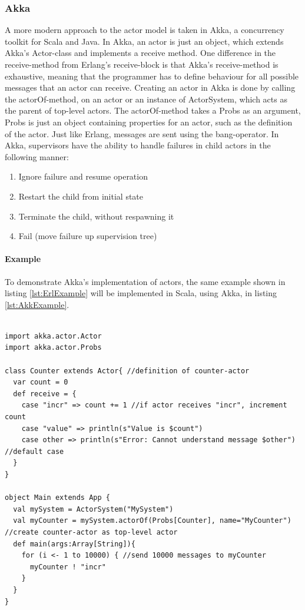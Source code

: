 \subsubsection{Akka}
A more modern approach to the actor model is taken in Akka, a concurrency toolkit for Scala and Java.
In Akka, an actor is just an object, which extends Akka's Actor-class and implements a receive method. One difference in the receive-method from Erlang's receive-block is that Akka's receive-method is exhaustive, meaning that the programmer has to define behaviour for all possible messages that an actor can receive. 
Creating an actor in Akka is done by calling the actorOf-method, on an actor or an instance of ActorSystem, which acts as the parent of top-level actors. The actorOf-method takes a Probs as an argument, Probs is just an object containing properties for an actor, such as the definition of the actor. Just like Erlang, messages are sent using the bang-operator.
In Akka, supervisors have the ability to handle failures in child actors in the following manner:
\begin{enumerate}
  \item Ignore failure and resume operation
  \item Restart the child from initial state
  \item Terminate the child, without respawning it
  \item Fail (move failure up supervision tree)
\end{enumerate}

\paragraph{Example}
To demonstrate Akka's implementation of actors, the same example shown in listing \ref{lst:ErlExample} will be implemented in Scala, using Akka, in listing \ref{lst:AkkExample}.

\begin{lstlisting}[style = scala, caption={A simple message-counter in Scala.}, label=lst:AkkExample]

import akka.actor.Actor
import akka.actor.Probs

class Counter extends Actor{ //definition of counter-actor
  var count = 0
  def receive = {
    case "incr" => count += 1 //if actor receives "incr", increment count
    case "value" => println(s"Value is $count")
    case other => println(s"Error: Cannot understand message $other") //default case
  }
}

object Main extends App {
  val mySystem = ActorSystem("MySystem")
  val myCounter = mySystem.actorOf(Probs[Counter], name="MyCounter") //create counter-actor as top-level actor
  def main(args:Array[String]){
    for (i <- 1 to 10000) { //send 10000 messages to myCounter
      myCounter ! "incr"
    }
  }
}
\end{lstlisting}

